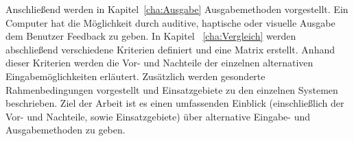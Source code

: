 \newline \newline
Anschließend werden in Kapitel~\ref{cha:Ausgabe} Ausgabemethoden vorgestellt. Ein Computer hat die Möglichkeit durch auditive, haptische oder visuelle Ausgabe dem Benutzer Feedback zu geben.
\newline \newline
In Kapitel ~\ref{cha:Vergleich} werden abschließend verschiedene Kriterien definiert und eine Matrix erstellt. Anhand dieser Kriterien werden die Vor- und Nachteile der einzelnen alternativen Eingabemöglichkeiten erläutert. Zusätzlich werden gesonderte Rahmenbedingungen vorgestellt und Einsatzgebiete zu den einzelnen Systemen beschrieben.
\newline \newline
Ziel der Arbeit ist es einen umfassenden Einblick (einschließlich der Vor- und Nachteile, sowie Einsatzgebiete) über alternative Eingabe- und Ausgabemethoden zu geben.
